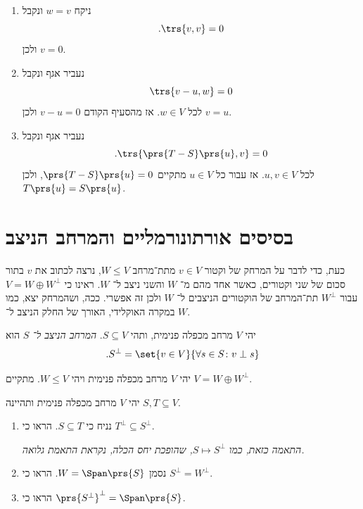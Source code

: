 \documentclass[a4paper,10pt,twoside,openany]{book}
\begin{document}
\begin{solution}
\begin{enumerate}
\item ניקח
$w = v$
ונקבל
\[\text{.} \trs{v,v} = 0\]
ולכן
$v = 0$.
\item נעביר אגף ונקבל
\[\trs{v-u, w} = 0\]
לכל
$w \in V$.
אז מהסעיף הקודם
$v-u = 0$
ולכן
$v = u$.
\item נעביר אגף ונקבל
\[\text{.} \trs{\prs{T-S}\prs{u},v} = 0\]
לכל
$u,v \in V$.
אז עבור כל
$u \in V$
מתקיים
$\prs{T-S}\prs{u} = 0$,
ולכן
$T\prs{u} = S\prs{u}$.
\end{enumerate}
\end{solution}

\section{בסיסים אורתונורמליים והמרחב הניצב}

כעת, כדי לדבר על המרחק של וקטור
$v \in V$
מתת־מרחב
$W \leq V$,
נרצה לכתוב את
$v$
בתור סכום של שני וקטורים, כאשר אחד מהם מ־%
$W$
והשני ניצב ל־%
$W$.
ראינו כי
$V = W \oplus W^{\perp}$
עבור
$W^\perp$
תת־המרחב של הוקטורים הניצבים ל־%
$W$
ולכן זה אפשרי.
ככה, ושהמרחק יצא, כמו במקרה האוקלידי, האורך של החלק הניצב ל־%
$W$.

\begin{definition}
יהי
$V$
מרחב מכפלה פנימית, ותהי
$S \subseteq V$.
\emph{המרחב הניצב ל־%
$S$}
הוא
\[\text{.} S^\perp = \set{v \in V}{\forall s \in S \colon v \perp s}\]
\end{definition}

\begin{proposition}
יהי
$V$
מרחב מכפלה פנימית ויהי
$W \leq V$.
מתקיים
$V = W \oplus W^\perp$.
\end{proposition}

\begin{exercisechap}
יהי
$V$
מרחב מכפלה פנימית ותהיינה
$S,T \subseteq V$.

\begin{enumerate}
\item 
נניח כי
$S \subseteq T$.
הראו כי
$T^\perp \subseteq S^\perp$.

\emph{התאמה כזאת, כמו $S \mapsto S^\perp$, שהופכת יחס הכלה, נקראת
\emph{התאמת גלואה}.}

\item
נסמן
$W = \Span\prs{S}$.
הראו כי
$S^\perp = W^\perp$.

\item
הראו כי
$\prs{S^{\perp}}^\perp = \Span\prs{S}$.
\end{enumerate}
\end{exercisechap}
\end{document}

